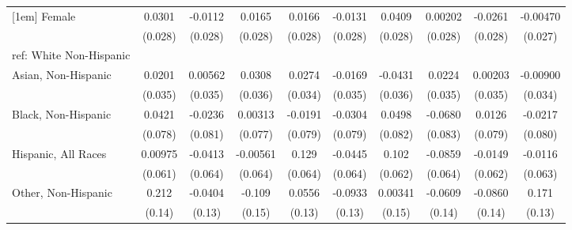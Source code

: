 \begin{table}[htbp]
\begin{tabular}{l*{9}{c}}
[1em]
Female&      0.0301         &     -0.0112         &      0.0165         &      0.0166         &     -0.0131         &      0.0409         &     0.00202         &     -0.0261         &    -0.00470         \\
  &     (0.028)         &     (0.028)         &     (0.028)         &     (0.028)         &     (0.028)         &     (0.028)         &     (0.028)         &     (0.028)         &     (0.027)         \\
[1em]
ref: White Non-Hispanic&                     &                     &                     &                     &                     &                     &                     &                     &                     \\
[1em]
Asian, Non-Hispanic&      0.0201         &     0.00562         &      0.0308         &      0.0274         &     -0.0169         &     -0.0431         &      0.0224         &     0.00203         &    -0.00900         \\
  &     (0.035)         &     (0.035)         &     (0.036)         &     (0.034)         &     (0.035)         &     (0.036)         &     (0.035)         &     (0.035)         &     (0.034)         \\
[1em]
Black, Non-Hispanic&      0.0421         &     -0.0236         &     0.00313         &     -0.0191         &     -0.0304         &      0.0498         &     -0.0680         &      0.0126         &     -0.0217         \\
  &     (0.078)         &     (0.081)         &     (0.077)         &     (0.079)         &     (0.079)         &     (0.082)         &     (0.083)         &     (0.079)         &     (0.080)         \\
[1em]
Hispanic, All Races&     0.00975         &     -0.0413         &    -0.00561         &       0.129\sym{**} &     -0.0445         &       0.102\sym{*}  &     -0.0859         &     -0.0149         &     -0.0116         \\
  &     (0.061)         &     (0.064)         &     (0.064)         &     (0.064)         &     (0.064)         &     (0.062)         &     (0.064)         &     (0.062)         &     (0.063)         \\
[1em]
Other, Non-Hispanic&       0.212         &     -0.0404         &      -0.109         &      0.0556         &     -0.0933         &     0.00341         &     -0.0609         &     -0.0860         &       0.171         \\
  &      (0.14)         &      (0.13)         &      (0.15)         &      (0.13)         &      (0.13)         &      (0.15)         &      (0.14)         &      (0.14)         &      (0.13)         \\

\end{tabular}
\end{table}
